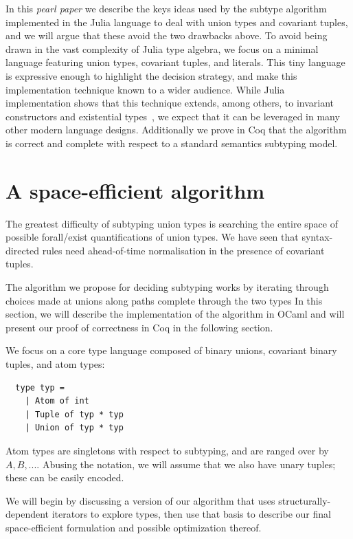\documentclass[a4paper,english]{lipics-v2019}
\begin{document}
In this \emph{pearl paper} we describe the keys ideas used by the
subtype algorithm implemented in the Julia language to deal with
union types and covariant tuples, and we will argue that these avoid the
two drawbacks above.  To avoid being drawn in the vast complexity of
Julia type algebra, we focus on a minimal language featuring union
types, covariant tuples, and literals.  This tiny language is
expressive enough to highlight the decision strategy, and make this
implementation technique known to a wider audience.  While Julia
implementation shows that this technique extends, among others, to
invariant constructors and existential
types~\cite{DBLP:NardelliBPCBV18}, we expect that it
can be leveraged in many other modern language designs.  Additionally
we prove in Coq that the algorithm is correct and complete with
respect to a standard semantics subtyping model.


\section{A space-efficient algorithm}

The greatest difficulty of subtyping union types is searching the entire space
of possible forall/exist quantifications of union types. We have seen that
syntax-directed rules need ahead-of-time normalisation in the presence of
covariant tuples.

The algorithm we propose for deciding subtyping works by iterating through
choices made at unions along paths complete through the two types In this
section, we will describe the implementation of the algorithm in OCaml and
will present our proof of correctness in Coq in the following section.

We focus on a core type language composed of binary unions, covariant binary
tuples, and atom types:
\begin{small}
\begin{verbatim}
  type typ =
    | Atom of int
    | Tuple of typ * typ
    | Union of typ * typ
\end{verbatim}
\end{small}
Atom types are singletons with respect to subtyping, and are ranged
over by
\(A, B, ...\).  Abusing the
notation, we will assume that we also have unary
tuples; these can be easily encoded. 


We will begin by discussing a version of our algorithm that uses structurally-
dependent iterators to explore types, then use that basis to describe our
final space-efficient formulation and possible optimization thereof. 
\end{document}
